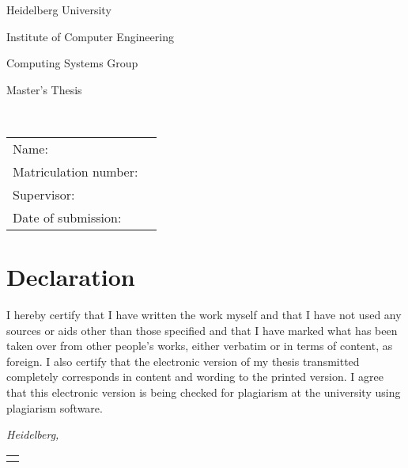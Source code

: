 \begin{titlepage}
\begin{addmargin}[-1cm]{-3cm}
	\begin{center}
		\begingroup
		\Huge
		Heidelberg University \\ \bigskip
		\endgroup

		\begingroup
		\Large
		Institute of Computer Engineering \\ \smallskip
		\endgroup

		\begingroup
		\Large
		Computing Systems Group \\ \smallskip
		\endgroup

		\begingroup
		\Large
		Master's Thesis \\ \bigskip
		\endgroup

		\begingroup
		\Huge
		\myTitle \\ \smallskip
		\endgroup

		\vfill
		\hfill
	\end{center}
	\begingroup
	\large
	\noindent
	\begin{tabular}{ll}
		Name: & \myName \\
		Matriculation number: & \myMatNr \\
		Supervisor: & \myProf \\
		Date of submission: & \mySubmissionDate \\
	\end{tabular}
	\endgroup
\end{addmargin}
\end{titlepage}
\cleardoublepage

\chapter*{Declaration}
\thispagestyle{empty}
I hereby certify that I have written the work myself and that I have not used
any sources or aids other than those specified and that I have marked what
has been taken over from other people's works, either verbatim or in terms of
content, as foreign. I also certify that the electronic version of my thesis
transmitted completely corresponds in content and wording to the printed
version. I agree that this electronic version is being checked for plagiarism
at the university using plagiarism software.
\bigskip

\noindent\textit{Heidelberg, \mySubmissionDate}

\smallskip

\begin{flushright}
	\begin{tabular}{m{5cm}}
		\\ \hline
		\centering\myName \\
	\end{tabular}
\end{flushright}
